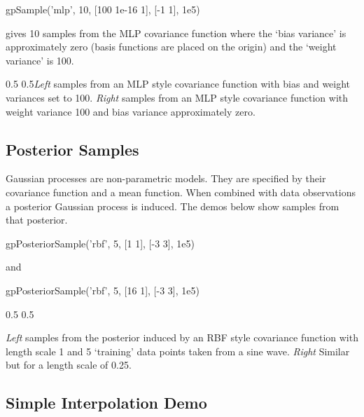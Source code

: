 \begin{octave}
 gpSample('mlp', 10, [100 1e-16 1], [-1 1], 1e5)
\end{octave}

gives 10 samples from the MLP covariance function where the `bias
variance' is approximately zero (basis functions are placed on
the origin) and the `weight variance' is 100.

\begin{center} 0.5\textwidth {}
0.5\textwidth \emph{Left} samples from an MLP style covariance
function with bias and weight variances set to 100. \emph{Right}
samples from an MLP style covariance function with weight variance 100
and bias variance approximately zero.  
\end{center}


\subsection{Posterior Samples}

Gaussian processes are non-parametric models. They are specified by their covariance function and a mean function. When combined with data observations a posterior Gaussian process is induced. The demos below show samples from that posterior.

\begin{octave}
  gpPosteriorSample('rbf', 5, [1 1], [-3 3], 1e5)
\end{octave}

and 

\begin{octave}
  gpPosteriorSample('rbf', 5, [16 1], [-3 3], 1e5)
\end{octave}

\begin{center} 0.5\textwidth {} 0.5\textwidth 

\emph{Left} samples from the posterior induced by an RBF style covariance function
with length scale 1 and 5 `training' data points taken from a sine wave. \emph{Right} Similar but for a length scale of 0.25.  
\end{center}

\subsection{Simple Interpolation Demo}

